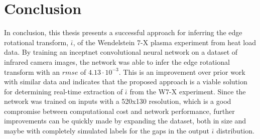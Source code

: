 %
\chapter{Conclusion}
\label{sec:conclusion}

In conclusion, this thesis presents a successful approach for inferring the edge rotational transform, $\bar{\iota}$, of the Wendelstein 7-X plasma experiment from heat load data. By training an inceptnet convolutional neural network on a dataset of infrared camera images, the network was able to infer the edge rotational transform with an $rmse$ of $4.13 \cdot 10^{-3}$. This is an improvement over prior work with similar data and indicates that the proposed approach is a viable solution for determining real-time extraction of $\bar{\iota}$ from the W7-X experiment. Since the network was trained on inputs with a 520x130 resolution, which is a good compromise between computational cost and network performance, further improvements can be quickly made by expanding the dataset, both in size and maybe with completely simulated labels for the gaps in the output $\bar{\iota}$ distribution.

